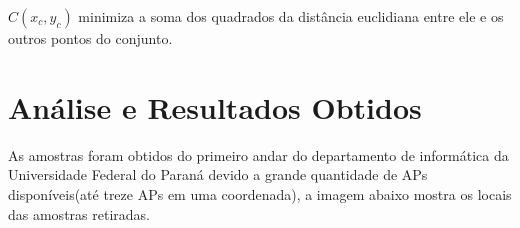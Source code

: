   $C(x_c,y_c)$ minimiza a soma dos quadrados da distância euclidiana entre ele e os outros pontos do conjunto\cite{centroid}.
  
  \section{Análise e Resultados Obtidos}
  As amostras foram obtidos do primeiro andar do departamento de informática da Universidade Federal do Paraná devido a 
  grande quantidade de APs disponíveis(até treze APs em uma coordenada), a imagem abaixo mostra os locais das amostras retiradas.

    

